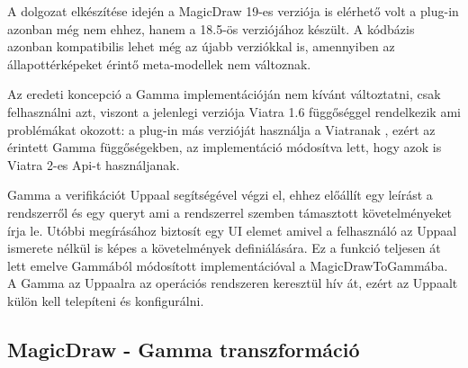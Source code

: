 A dolgozat elkészítése idején a MagicDraw 19-es verziója is elérhető volt a plug-in azonban még nem ehhez, hanem a 18.5-ös verziójához készült. A kódbázis azonban kompatibilis lehet még az újabb verziókkal is, amennyiben az állapottérképeket érintő meta-modellek nem változnak.

Az eredeti koncepció  a Gamma implementációján nem kívánt változtatni, csak felhasználni azt, viszont a jelenlegi verziója Viatra 1.6 függőséggel rendelkezik ami problémákat okozott: a plug-in más verzióját használja a Viatranak , ezért az érintett Gamma függőségekben, az implementáció módosítva lett, hogy azok is Viatra 2-es Api-t használjanak.

Gamma a verifikációt Uppaal segítségével végzi el, ehhez előállít egy leírást a rendszerről és egy queryt ami a rendszerrel szemben támasztott követelményeket írja le. Utóbbi megírásához biztosít egy UI elemet amivel a felhasználó az Uppaal ismerete nélkül is képes a követelmények definiálására. Ez a funkció teljesen át lett emelve Gammából módosított implementációval a MagicDrawToGammába. A Gamma az Uppaalra az operációs rendszeren keresztül hív át, ezért az Uppaalt külön kell telepíteni és konfigurálni.

\subsection{MagicDraw - Gamma transzformáció}
